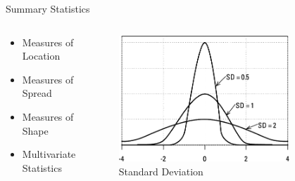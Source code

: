 \documentclass[10pt,aspectratio=169]{beamer} %
\newcommand{\hide}[1] {
	\textcolor{hiddencolor}{#1}
}
\begin{document}
\begin{frame}{Summary Statistics}
\begin{columns}[c]
\begin{column}{0.35\textwidth}
\begin{itemize}
\item \hide{Measures of Location}
\item \alert{Measures of Spread}
\item \hide{Measures of Shape}
\item \hide{Multivariate Statistics}
\end{itemize}
\end{column}

\begin{column}{0.65\textwidth}
\begin{figure}
    \includegraphics[width=0.8\textwidth]{measure_spread.png}
    \caption{Standard Deviation}
\end{figure}
\end{column}
\end{columns}
\end{frame}
\end{document}
